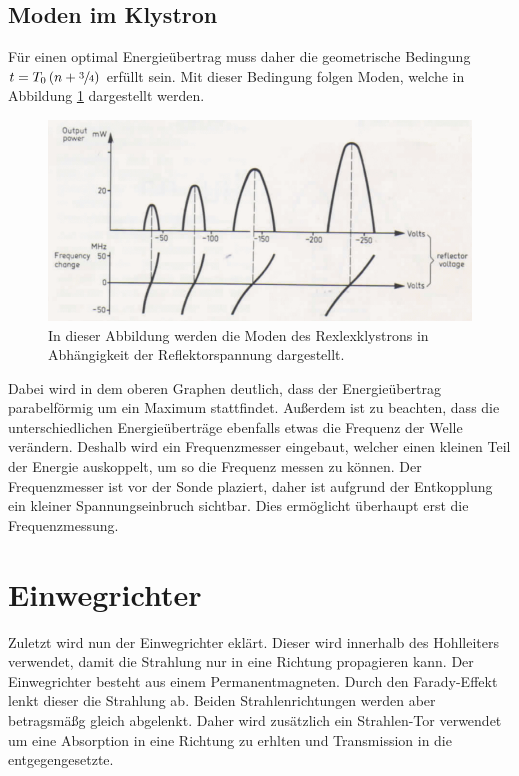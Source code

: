 \subsection{Moden im Klystron}
\label{subsec:moden}
Für einen optimal Energieübertrag muss daher die geometrische Bedingung $t = T_0\left(n+\sfrac{3}{4}\right)$ erfüllt sein. Mit dieser Bedingung folgen Moden, welche in Abbildung 
\ref{fig:moden} dargestellt werden. 

\begin{figure}
              \centering
              \includegraphics[width = .9\textwidth]{content/moden.PNG}
              \caption{In dieser Abbildung werden die Moden des Rexlexklystrons in Abhängigkeit der Reflektorspannung dargestellt.}
              \label{fig:moden}
\end{figure}

Dabei wird in dem oberen Graphen deutlich, dass der Energieübertrag parabelförmig um ein Maximum stattfindet. Außerdem ist zu beachten, dass die unterschiedlichen Energieüberträge 
ebenfalls etwas die Frequenz der Welle verändern. Deshalb wird ein Frequenzmesser eingebaut, welcher einen kleinen Teil der Energie auskoppelt, um so die Frequenz messen zu können.
Der Frequenzmesser ist vor der Sonde plaziert, daher ist aufgrund der Entkopplung ein kleiner Spannungseinbruch sichtbar. Dies ermöglicht überhaupt erst die Frequenzmessung.

\section{Einwegrichter}
\label{sec:einwegrichter}

Zuletzt wird nun der Einwegrichter eklärt. Dieser wird innerhalb des Hohlleiters verwendet, damit die Strahlung nur in eine Richtung propagieren kann. Der Einwegrichter besteht aus 
einem Permanentmagneten. Durch den Farady-Effekt lenkt dieser die Strahlung ab. Beiden Strahlenrichtungen werden aber betragsmäßg gleich abgelenkt. Daher wird zusätzlich ein 
Strahlen-Tor verwendet um eine Absorption in eine Richtung zu erhlten und Transmission in die entgegengesetzte.

